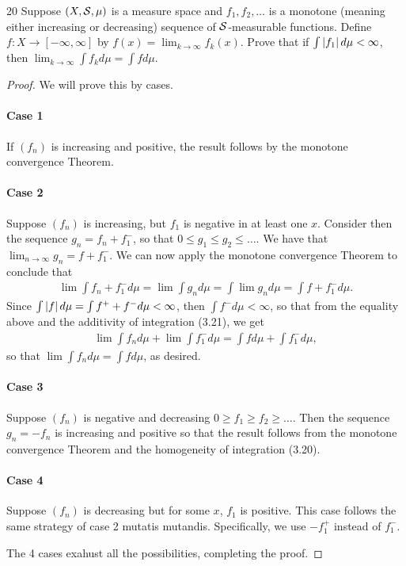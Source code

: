 \begin{exercise}{20}
Suppose $(X, \mathcal{S}, \mu)$ is a measure space and $f_1, f_2, \dots$ is a monotone (meaning either increasing or decreasing) sequence of $\mathcal{S}$-measurable functions.
Define $f: X \to [-\infty, \infty]$ by $f(x) = \lim_{k \to \infty} f_k(x)$.
Prove that if $\int \left\lvert f_1\right\rvert d\mu < \infty$, then $\lim_{k \to \infty} \int f_k d\mu = \int f d\mu$.
\end{exercise}
\begin{proof}
We will prove this by cases.

\paragraph{Case 1} If $(f_n)$ is increasing and positive, the result follows by the monotone convergence Theorem.

\paragraph{Case 2} Suppose $(f_n)$ is increasing, but $f_1$ is negative in at least one $x$.
Consider then the sequence $g_n = f_n + f_1^-$, so that $0 \leq g_1 \leq g_2 \leq \dots$.
We have that $\lim_{n \to \infty} g_n = f + f_1^-$.
We can now apply the monotone convergence Theorem to conclude that 
\begin{align*}
    \lim \int f_n + f_1^- d\mu
    = \lim \int g_n d\mu 
    = \int \lim g_n d\mu 
    = \int f + f_1^- d\mu.
\end{align*}
Since $\int \left\lvert f\right\rvert d\mu = \int f^+ + f^- d\mu < \infty$, then $\int f^- d\mu < \infty$, so that from the equality above and the additivity of integration (3.21), we get 
\begin{align*}
    \lim \int f_n d\mu + \lim \int f_1^- d\mu
    = \int f d\mu + \int f_1^- d\mu,
\end{align*}
so that $\lim \int f_n d\mu = \int f d\mu$, as desired.

\paragraph{Case 3} Suppose $(f_n)$ is negative and decreasing $0 \geq f_1 \geq f_2 \geq \dots$.
Then the sequence $g_n = -f_n$ is increasing and positive so that the result follows from the monotone convergence Theorem and the homogeneity of integration (3.20).

\paragraph{Case 4} Suppose $(f_n)$ is decreasing but for some $x$, $f_1$ is positive.
This case follows the same strategy of case 2 mutatis mutandis.
Specifically, we use $-f_1^+$ instead of $f_1^-$.

The 4 cases exahust all the possibilities, completing the proof.
\end{proof} 

